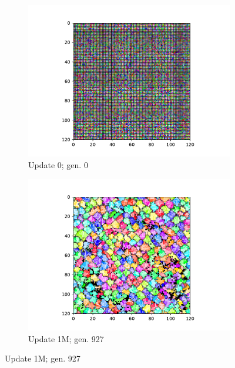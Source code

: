 \begin{figure}[!htbp]
\begin{center}
\begin{subfigure}[b]{0.5\columnwidth}
  \includegraphics[width=\columnwidth,trim={2.5cm 0.5cm 2.5cm 1cm},clip]{img/ChannelMap_1011_update0}
  \caption{Update 0; gen. 0}
  \label{fig:ChannelMap_1011_update0}
\end{subfigure}%
\begin{subfigure}[b]{0.5\columnwidth}
  \includegraphics[width=\columnwidth,trim={2.5cm 0.5cm 2.5cm 1cm},clip]{img/ChannelMap_1011_update1000000}
  \caption{Update 1M; gen. 927}
  \label{fig:ChannelMap_1011_update1000000}
\end{subfigure}

\end{center}
\end{figure}
